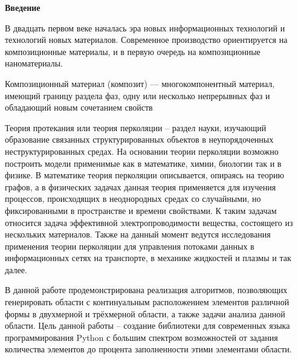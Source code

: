 \begin{center}
\LARGE\bf{Введение}
\end{center}

В двадцать первом веке началась эра новых информационных технологий и технологий новых материалов. Современное производство ориентируется на композиционные материалы, и в первую очередь на композиционные наноматериалы.

Композиционный материал (композит) — многокомпонентный материал, имеющий границу раздела фаз, одну или несколько непрерывных
фаз и обладающий новым сочетанием свойств

Теория протекания или теория перколяции – раздел науки, изучающий образование связанных структурированных объектов в неупорядоченных неструктурированных средах. На основании теории перколяции возможно построить модели применимые как в математике, химии, биологии так и в физике. В математике теория перколяции описывается, опираясь на теорию графов, а в физических задачах данная теория применяется для изучения процессов, происходящих в неоднородных средах со случайными, но фиксированными в пространстве и времени свойствами. К таким задачам относится задача эффективной электропроводимости вещества, состоящего из нескольких материалов. Также на данный момент ведутся исследования применения теории перколяции для управления потоками данных в информационных сетях на транспорте, в механике жидкостей и плазмы и так далее.

В данной работе продемонстрирована реализация алгоритмов, позволяющих генерировать области с континуальным расположением элементов различной формы в двухмерной и трёхмерной области, а также задачи анализа данной области. Цель данной работы – создание библиотеки для современных языка программирования Python с большим спектром возможностей от задания количества элементов до процента заполненности этими элементами области.